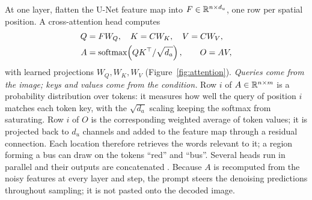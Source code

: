 At one layer, flatten the U-Net feature map into $F\in\mathbb{R}^{n\times d_u}$,
one row per spatial position. A cross-attention head
\cite{vaswani2017attention} computes
\begin{align}
Q&=FW_Q,\quad K=CW_K,\quad V=CW_V,\label{eq:qkv}\\
A&=\operatorname{softmax}\!\left(QK^\top/\sqrt{d_a}\right),\qquad O=AV,
\label{eq:attention}
\end{align}
with learned projections $W_Q,W_K,W_V$ (Figure~\ref{fig:attention}).
\emph{Queries come from the image; keys and values come from the condition.}
Row $i$ of $A\in\mathbb{R}^{n\times m}$ is a probability distribution over tokens:
it measures how well the query of position $i$ matches each token key,
with the $\sqrt{d_a}$ scaling keeping the softmax from saturating. Row $i$
of $O$ is the corresponding weighted average of token values; it is
projected back to $d_u$ channels and added to the feature map through a
residual connection. Each location therefore retrieves the words relevant
to it; a region forming a bus can draw on the tokens ``red'' and ``bus''.
Several heads run in parallel and their outputs are concatenated
\cite{vaswani2017attention}. Because $A$ is recomputed from the noisy
features at every layer and step, the prompt steers the denoising
predictions throughout sampling; it is not pasted onto the decoded image.

\begin{center}
\captionsetup{hypcap=false}
\label{fig:attention}
\end{center}

